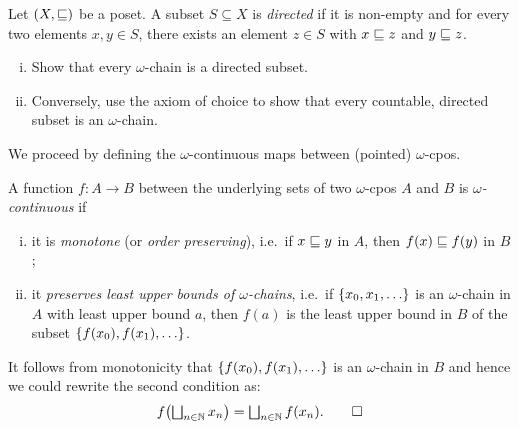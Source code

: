 \begin{exercise}\label{exer:directedness}
  Let \((X,{\sqsubseteq})\) be a poset. A subset \(S \subseteq X\) is \emph{directed}
  if it is non-empty and for every two elements \(x,y \in S\), there exists an
  element \(z \in S\) with \(x \sqsubseteq z\) and \(y \sqsubseteq z\).
  \begin{enumerate}[(i)]
  \item Show that every \(\omega\)-chain is a directed subset.
  \item Conversely, use the axiom of choice to show that every countable,
    directed subset is an \(\omega\)-chain.\qedhere
  \end{enumerate}
\end{exercise}

We proceed by defining the \(\omega\)-continuous maps between (pointed)
\(\omega\)-cpos.
\begin{definition}\label{def:continuity}
  A function \(f \colon A \to B\) between the underlying sets of two
  \(\omega\)-cpos \(A\) and \(B\) is \emph{\(\omega\)-continuous} if
  \begin{enumerate}[(i)]
  \item\label{monotone} it is \emph{monotone} (or \emph{order preserving}),
    i.e.\ if \(x \sqsubseteq y\) in \(A\), then \(f(x) \sqsubseteq f(y)\) in \(B\);
  \item\label{preserve-lub-of-omega-chains} it \emph{preserves least upper
      bounds of \(\omega\)-chains}, i.e.\ if \(\set{x_0,x_1,\dots}\) is an
    \(\omega\)-chain in \(A\) with least upper bound \(a\), then \(f(a)\) is the
    least upper bound in \(B\) of the subset \(\set{f(x_0),f(x_1),\dots}\). \qedhere
  \end{enumerate}
\end{definition}

\begin{remark}
  It follows from monotonicity that \(\set{f(x_0),f(x_1),\dots}\) is an
  \(\omega\)-chain in \(B\) and hence we could rewrite the second condition as:
  \[
    f\pa*{\textstyle\bigsqcup_{n \in \Nat}x_n} = \textstyle\bigsqcup_{n \in
      \Nat}f(x_n). \qedhere
  \]
\end{remark}


